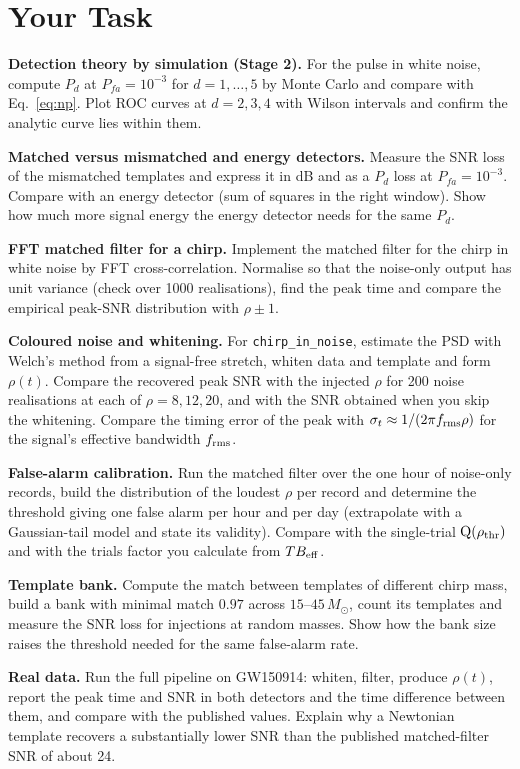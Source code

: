 \documentclass[11pt,a4paper]{article}
\begin{document}
\section*{Your Task}
\begin{tasks}
  \item \textbf{Detection theory by simulation (Stage 2).} For the pulse in white noise, compute $P_d$ at $P_{fa}=10^{-3}$ for $d=1,\dots,5$ by Monte Carlo and compare with Eq.~\eqref{eq:np}. Plot ROC curves at $d=2,3,4$ with Wilson intervals and confirm the analytic curve lies within them.
  \item \textbf{Matched versus mismatched and energy detectors.} Measure the SNR loss of the mismatched templates and express it in dB and as a $P_d$ loss at $P_{fa}=10^{-3}$. Compare with an energy detector (sum of squares in the right window). Show how much more signal energy the energy detector needs for the same $P_d$.
  \item \textbf{FFT matched filter for a chirp.} Implement the matched filter for the chirp in white noise by FFT cross-correlation. Normalise so that the noise-only output has unit variance (check over 1000 realisations), find the peak time and compare the empirical peak-SNR distribution with $\rho\pm1$.
  \item \textbf{Coloured noise and whitening.} For \texttt{chirp\_in\_noise}, estimate the PSD with Welch's method from a signal-free stretch, whiten data and template and form $\rho(t)$. Compare the recovered peak SNR with the injected $\rho$ for 200 noise realisations at each of $\rho=8,12,20$, and with the SNR obtained when you skip the whitening. Compare the timing error of the peak with $\sigma_t\approx1/(2\pi f_{\rm rms}\rho)$ for the signal's effective bandwidth $f_{\rm rms}$.
  \item \textbf{False-alarm calibration.} Run the matched filter over the one hour of noise-only records, build the distribution of the loudest $\rho$ per record and determine the threshold giving one false alarm per hour and per day (extrapolate with a Gaussian-tail model and state its validity). Compare with the single-trial $\operatorname{Q}(\rho_{\rm thr})$ and with the trials factor you calculate from $T B_{\rm eff}$.
  \item \textbf{Template bank.} Compute the match between templates of different chirp mass, build a bank with minimal match $0.97$ across $15$--$45\,M_\odot$, count its templates and measure the SNR loss for injections at random masses. Show how the bank size raises the threshold needed for the same false-alarm rate.
  \item \textbf{Real data.} Run the full pipeline on GW150914: whiten, filter, produce $\rho(t)$, report the peak time and SNR in both detectors and the time difference between them, and compare with the published values. Explain why a Newtonian template recovers a substantially lower SNR than the published matched-filter SNR of about 24.
\end{tasks}
\end{document}
